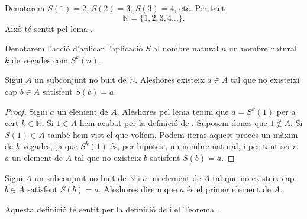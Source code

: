 \documentclass[../Apunts.tex]{subfiles}
\begin{document}
	\begin{notation}
		Denotarem \(S(1)=2\), \(S(2)=3\), \(S(3)=4\), etc. Per tant
		\[\mathbb{N}=\{1,2,3,4\dots\}.\]
		Això té sentit pel lema .
	\end{notation}
	\begin{notation}
		Denotarem l'acció d'aplicar l'aplicació \(S\) al nombre natural \(n\) un nombre natural \(k\) de vegades com \(S^{k}(n)\).
	\end{notation}
	\begin{theorem}
		\label{thm:primer element}
		Sigui \(A\) un subconjunt no buit de \(\mathbb{N}\). Aleshores existeix \(a\in A\) tal que no existeixi cap \(b\in A\) satisfent \(S(b)=a\).
		\begin{proof}
			Sigui \(a\) un element de \(A\). Aleshores pel lema  tenim que \(a=S^{k}(1)\) per a cert \(k\in\mathbb{N}\). Si \(1\in A\) hem acabat per la definició de . Suposem doncs que \(1\notin A\). Si \(S(1)\in A\) també hem vist el que volíem. Podem iterar aquest procés un màxim de \(k\) vegades, ja que \(S^{k}(1)\) és, per hipòtesi, un nombre natural, i per tant seria \(a\) un element de \(A\) tal que no existeix \(b\) satisfent \(S(b)=a\).
		\end{proof}
	\end{theorem}
	\begin{definition}
		\label{def:primer element}
		Sigui \(A\) un subconjunt no buit de \(\mathbb{N}\) i \(a\) un element de \(A\) tal que no existeix cap \(b\in A\) satisfent \(S(b)=a\). Aleshores direm que \(a\) és el primer element de \(A\).
		
		Aquesta definició té sentit per la definició de  i el Teorema .
	\end{definition}
\end{document}

